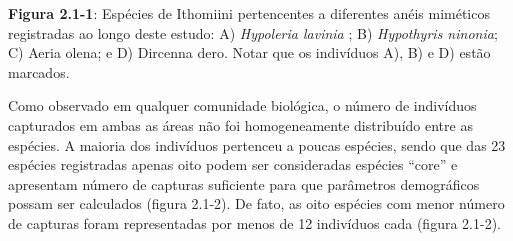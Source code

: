 \textbf{Figura 2.1-1}: Espécies de Ithomiini pertencentes a diferentes anéis miméticos registradas ao longo deste estudo: A) \textit{Hypoleria lavinia} ; B) \textit{Hypothyris ninonia}; C) Aeria olena; e D) Dircenna dero. Notar que os indivíduos A), B) e D) estão marcados.

Como observado em qualquer comunidade biológica, o número de indivíduos capturados em ambas as áreas não foi homogeneamente distribuído entre as espécies. A maioria dos indivíduos pertenceu a poucas espécies, sendo que das 23 espécies registradas apenas oito podem ser consideradas espécies “core” e apresentam número de capturas suficiente para que parâmetros demográficos possam ser calculados (figura 2.1-2). De fato, as oito espécies com menor número de capturas foram representadas por menos de 12 indivíduos cada (figura 2.1-2).